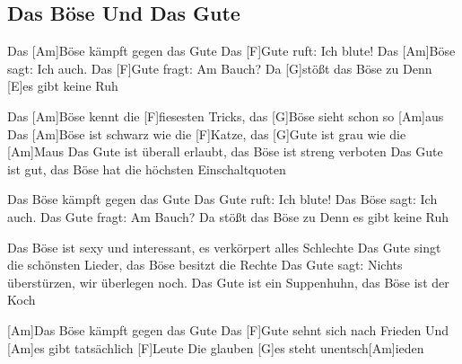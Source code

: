 \subsection*{Das Böse Und Das Gute   }
\begin{guitar}


Das [Am]Böse kämpft gegen das Gute
Das [F]Gute ruft: Ich blute!
Das [Am]Böse sagt: Ich auch.
Das [F]Gute fragt: Am Bauch?
Da [G]stößt das Böse zu
Denn [E]es gibt keine Ruh



Das [Am]Böse kennt die [F]fiesesten Tricks, das [G]Böse sieht schon so [Am]aus
Das [Am]Böse ist schwarz wie die [F]Katze, das [G]Gute ist grau wie die [Am]Maus
Das Gute ist überall erlaubt, das Böse ist streng verboten
Das Gute ist gut, das Böse hat die höchsten Einschaltquoten



Das Böse kämpft gegen das Gute
Das Gute ruft: Ich blute!
Das Böse sagt: Ich auch.
Das Gute fragt: Am Bauch?
Da stößt das Böse zu
Denn es gibt keine Ruh



Das Böse ist sexy und interessant, es verkörpert alles Schlechte
Das Gute singt die schönsten Lieder, das Böse besitzt die Rechte
Das Gute sagt: Nichts überstürzen, wir überlegen noch.
Das Gute ist ein Suppenhuhn, das Böse ist der Koch



[Am]Das Böse kämpft gegen das Gute
Das [F]Gute sehnt sich nach Frieden
Und [Am]es gibt tatsächlich [F]Leute
Die glauben [G]es steht unentsch[Am]ieden 

\end{guitar}
